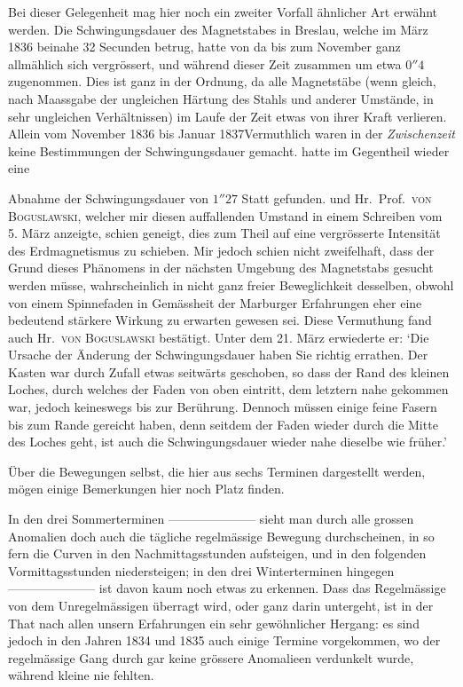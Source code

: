 Bei dieser Gelegenheit mag hier noch ein zweiter Vorfall ähnlicher Art erwähnt werden. Die Schwingungsdauer des Magnetstabes in Breslau, welche im März 1836 beinahe 32 Secunden betrug, hatte von da bis zum November ganz allmählich sich vergrössert, und während dieser Zeit zusammen um etwa $0''4$ zugenommen. Dies ist ganz in der Ordnung, da alle Magnetstäbe (wenn gleich, nach Maassgabe der ungleichen Härtung des Stahls und anderer Umstände, in sehr ungleichen Verhältnissen) im Laufe der Zeit etwas von ihrer Kraft verlieren. Allein vom November 1836 bis Januar 1837\expandafter\def\csname HistoricalNoteText577\endcsname{Vermuthlich waren in der \textit{Zwischenzeit} keine Bestimmungen der Schwingungsdauer gemacht.} hatte im Gegentheil wieder eine
\par
\clearpage
{}
\noindent Abnahme der Schwingungsdauer von $1''27$ Statt gefunden. und Hr.\ Prof.\ \textsc{von Boguslawski}, welcher mir diesen auffallenden Umstand in einem Schreiben vom 5. März anzeigte, schien geneigt, dies zum Theil auf eine vergrösserte Intensität des Erdmagnetismus zu schieben. Mir jedoch schien nicht zweifelhaft, dass der Grund dieses Phänomens in der nächsten Umgebung des Magnetstabs gesucht werden müsse, wahrscheinlich in nicht ganz freier Beweglichkeit desselben, obwohl von einem Spinnefaden in Gemässheit der Marburger Erfahrungen eher eine bedeutend stärkere Wirkung zu erwarten gewesen sei. Diese Vermuthung fand auch Hr.\ \textsc{von Boguslawski} bestätigt. Unter dem 21. März erwiederte er: `Die Ursache der Änderung der Schwingungsdauer haben Sie richtig errathen. Der Kasten war durch Zufall etwas seitwärts geschoben, so dass der Rand des kleinen Loches, durch welches der Faden von oben eintritt, dem letztern nahe gekommen war, jedoch keineswegs bis zur Berührung. Dennoch müssen einige feine Fasern bis zum Rande gereicht haben, denn seitdem der Faden wieder durch die Mitte des Loches geht, ist auch die Schwingungsdauer wieder nahe dieselbe wie früher.'

Über die Bewegungen selbst, die hier aus sechs Terminen dargestellt werden, mögen einige Bemerkungen hier noch Platz finden.

In den drei Sommerterminen ---\quad---\quad---\quad---\quad---\quad---\quad--- sieht man durch alle grossen Anomalien doch auch die tägliche regelmässige Bewegung durchscheinen, in so fern die Curven in den Nachmittagsstunden aufsteigen, und in den folgenden Vormittagsstunden niedersteigen; in den drei Winterterminen hingegen ---\quad---\quad---\quad---\quad---\quad---\quad--- ist davon kaum noch etwas zu erkennen. Dass das Regelmässige von dem Unregelmässigen überragt wird, oder ganz darin untergeht, ist in der That nach allen unsern Erfahrungen ein sehr gewöhnlicher Hergang: es sind jedoch in den Jahren 1834 und 1835 auch einige Termine vorgekommen, wo der regelmässige Gang durch gar keine grössere Anomalieen verdunkelt wurde, während kleine nie fehlten.

